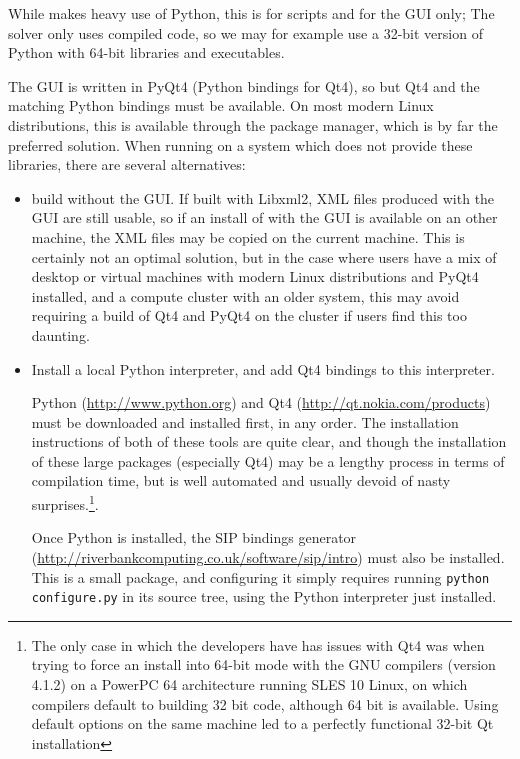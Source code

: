 \documentclass[a4paper,10pt,twoside]{article}
\begin{document}
While \CS makes heavy use of Python, this is for scripts and for the GUI only;
The solver only uses compiled code, so we may for example use
a 32-bit version of Python with 64-bit \CS libraries and executables.

The GUI is written in PyQt4 (Python bindings for Qt4), so but Qt4 and
the matching Python bindings must be available. On most modern
Linux distributions, this is available through the package manager,
which is by far the preferred solution. When running on a system which does
not provide these libraries, there are several alternatives:

\begin{itemize}

\item build \CS without the GUI. If built with Libxml2, XML files
      produced with the GUI are still usable, so if an install of \CS
      with the GUI is available on an other machine, the XML files
      may be copied on the current machine. This is certainly not an optimal
      solution, but in the case where users have a mix of desktop or virtual
      machines with modern Linux distributions and PyQt4 installed, and
      a compute cluster with an older system, this may avoid requiring
      a build of Qt4 and PyQt4 on the cluster if users find this too daunting.

\item Install a local Python interpreter, and add Qt4 bindings to this
      interpreter.

      Python (\url{http://www.python.org}) and Qt4
      (\url{http://qt.nokia.com/products}) must be downloaded  and
      installed first, in any order. The installation instructions of
      both of these tools are quite clear, and though the installation of these
      large packages (especially Qt4) may be a lengthy process in terms of
      compilation time, but is well automated and usually devoid of nasty
      surprises.\footnote{The only case in which the \CS developers
      have has issues with Qt4 was when trying to force an install into
      64-bit mode with the GNU compilers (version 4.1.2) on a PowerPC 64
      architecture running SLES 10 Linux, on which compilers default
      to building 32 bit code, although 64 bit is available. Using default
      options on the same machine led to a perfectly functional 32-bit Qt
      installation}.

      Once Python is installed, the SIP bindings generator
      (\url{http://riverbankcomputing.co.uk/software/sip/intro})
      must also be installed. This is a small package, and configuring it
      simply requires running \texttt{python configure.py} in its source
      tree, using the Python interpreter just installed.


\end{itemize}
\end{document}
